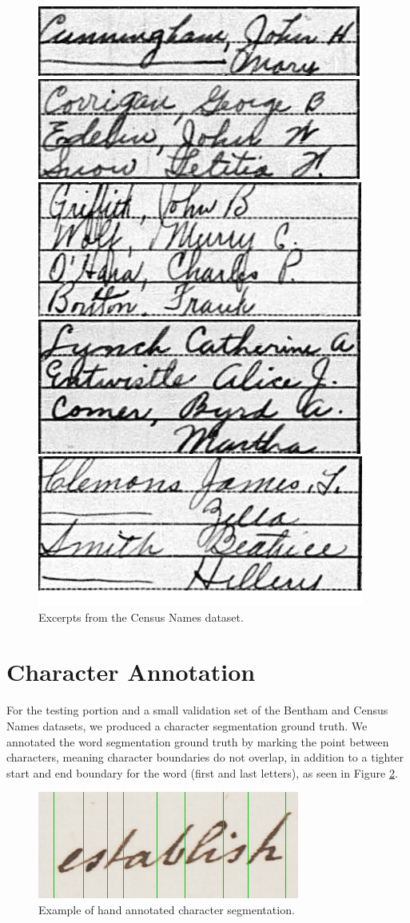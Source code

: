 \documentclass[ms,electronic,twosidetoc,letterpaper,chaptercenter,parttop,lof,lot]{byumsphd}
\begin{document}
\begin{figure}
    \centering
    \includegraphics[width=.5\textwidth]{names_examples}
    \caption{Excerpts from the Census Names dataset.}
    \label{fig:NamesExamples}
\end{figure}

\section{Character Annotation}

For the testing portion and a small validation set of the Bentham and Census Names datasets, we produced a character segmentation ground truth. We annotated the word segmentation ground truth by marking the point between characters, meaning character boundaries do not overlap, in addition to a tighter start and end boundary for the word (first and last letters), as seen in Figure \ref{fig:charseg}.

\begin{figure}
    \centering
    \includegraphics[width=.5\textwidth]{charseg}
    \caption{Example of hand annotated character segmentation.}
    \label{fig:charseg}
\end{figure}
\end{document}
